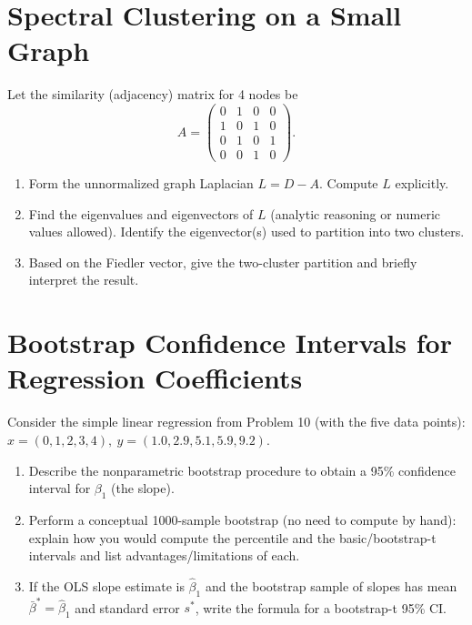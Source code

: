 \documentclass[12pt,a4paper]{article}
\begin{document}
\section{Spectral Clustering on a Small Graph}
Let the similarity (adjacency) matrix for 4 nodes be
\[ A = \begin{pmatrix} 0 & 1 & 0 & 0 \\ 1 & 0 & 1 & 0 \\ 0 & 1 & 0 & 1 \\ 0 & 0 & 1 & 0 \end{pmatrix}. \]
\begin{enumerate}[label=(\arabic*)]
\item Form the unnormalized graph Laplacian \(L = D - A\). Compute \(L\) explicitly.
\item Find the eigenvalues and eigenvectors of \(L\) (analytic reasoning or numeric values allowed). Identify the eigenvector(s) used to partition into two clusters.
\item Based on the Fiedler vector, give the two-cluster partition and briefly interpret the result.
\end{enumerate}

\section{Bootstrap Confidence Intervals for Regression Coefficients}
Consider the simple linear regression from Problem 10 (with the five data points):
\(x = (0,1,2,3,4),\ y = (1.0,2.9,5.1,5.9,9.2)\).
\begin{enumerate}[label=(\arabic*)]
\item Describe the nonparametric bootstrap procedure to obtain a 95\% confidence interval for \(\beta_1\) (the slope).
\item Perform a conceptual 1000-sample bootstrap (no need to compute by hand): explain how you would compute the percentile and the basic/bootstrap-t intervals and list advantages/limitations of each.
\item If the OLS slope estimate is \(\hat{\beta}_1\) and the bootstrap sample of slopes has mean \(\bar{\beta}^{*}=\hat{\beta}_1\) and standard error \(s^{*}\), write the formula for a bootstrap-t 95\% CI.
\end{enumerate}
\end{document}

